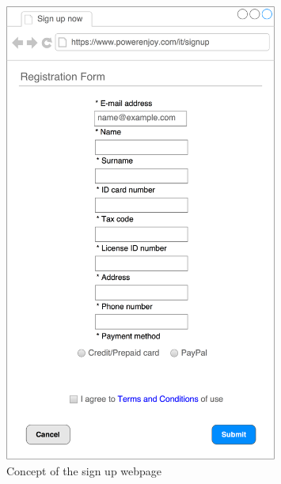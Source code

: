 \begin{figure}[H]
\begin{center}
		\includegraphics[width=0.8\textwidth]{./specific_requirements/features/diagrams/web_registration.png}
		\caption{Concept of the sign up webpage}
\end{center}
\end{figure}